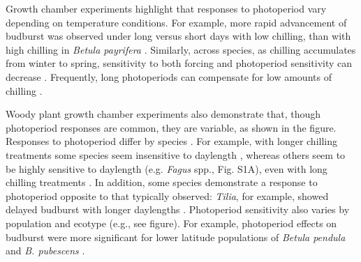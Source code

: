 \documentclass{article}
\begin{document}
\par Growth chamber experiments highlight that responses to photoperiod vary depending on temperature conditions. For example, more rapid advancement of budburst was observed under long versus short days with low chilling, than with high chilling in \emph{Betula payrifera} \citep[][see figure]{Hawkins:2012}. Similarly, across species, as chilling accumulates from winter to spring, sensitivity to both forcing and photoperiod sensitivity can decrease \citep{malyshev2018}. Frequently, long photoperiods can compensate for low amounts of chilling \citep{Caffarra:2011b,Myking:1995,Heide:1993}.%
\par Woody plant growth chamber experiments also demonstrate that, though photoperiod responses are common, they are variable, as shown in the figure. Responses to photoperiod differ by species \citep[e.g.,][]{flynn2018,zohner2016,Basler:2014aa,Basler:2012,Howe:1996,Heide:1993a}.
For example, with longer chilling treatments some species seem insensitive to daylength \citep[e.g., \emph{Hammamelis} spp., \emph{Prunus} spp.,][]{zohner2016}, %
whereas others seem to be highly sensitive to daylength (e.g. \emph{Fagus} spp., Fig. S1A), even with long chilling treatments \citep{zohner2016}. In addition, some species demonstrate a response to photoperiod opposite to that typically observed: \emph{Tilia}, for example, showed delayed budburst with longer daylengths \citep[see figure,][]{Ashby:1962aa}. %
Photoperiod sensitivity also varies by population and ecotype (e.g., see figure). For example, photoperiod effects on budburst were more significant for lower latitude populations of \emph{Betula pendula} and \emph{B. pubescens} \citep{Partanen:2005aa}. 
\end{document}
